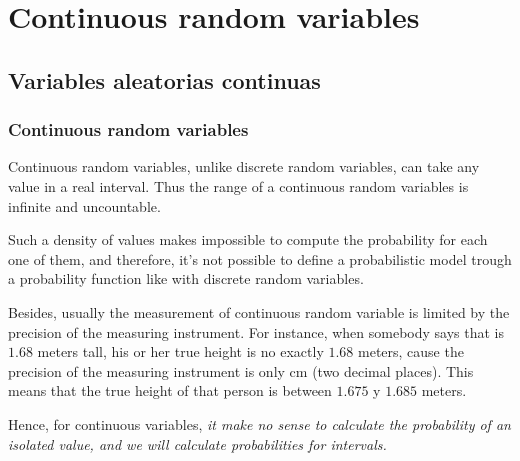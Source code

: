 \section{Continuous random variables}



\subsection{Variables aleatorias continuas}

\begin{frame}
\frametitle{Continuous random variables}
Continuous random variables, unlike discrete random variables, can take any value in a real interval. 
Thus the range of a continuous random variables is infinite and uncountable. 

Such a density of values makes impossible to compute the probability for each one of them, and therefore, it's not
possible to define a probabilistic model trough a probability function like with discrete random variables.

Besides, usually the measurement of continuous random variable is limited by the precision of the measuring instrument.
For instance, when somebody says that is $1.68$ meters tall, his or her true height is no exactly $1.68$ meters, cause
the precision of the measuring instrument is only cm (two decimal places). 
This means that the true height of that person is between $1.675$ y $1.685$ meters.

Hence, for continuous variables, \alert{\emph{it make no sense to calculate the probability of an isolated value, and we
will calculate probabilities for intervals.}}
\end{frame}


